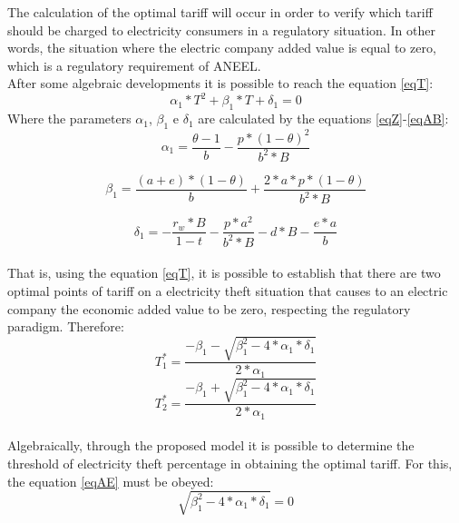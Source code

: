 \documentclass[10pt, letterpaper]{elsarticle}
\begin{document}
The calculation of the optimal tariff will occur in order to verify which tariff should be charged to electricity consumers in a regulatory situation. In other words, the situation where the electric company added value is equal to zero, which is a regulatory requirement of ANEEL.\\
After some algebraic developments it is possible to reach the equation \ref{eqT}:
\begin{equation}
\alpha_1 *T^2 +\beta_1 * T + \delta_1 = 0
\label{eqT}
\end{equation}
Where the parameters $\alpha_1$, $\beta_1$ e $\delta_1$ are calculated by the equations \ref{eqZ}-\ref{eqAB}:
\begin{equation}
\alpha_1 = \frac{\theta - 1}{b} - \frac{p*(1-\theta)^2}{b^2*B}
\label{eqZ}
\end{equation}

\begin{equation}
\beta_1 = \frac{(a+e)*(1-\theta)}{b}+\frac{2*a*p*(1-\theta)}{b^2*B}
\label{eqAA}
\end{equation}

\begin{equation}
\delta_1 = -\frac{r_w *B}{1-t}- \frac{p*a^2}{b^2*B}-d*B- \frac{e*a}{b}
\label{eqAB}
\end{equation}\\
That is, using the equation \ref{eqT}, it is possible to establish that there are two optimal points of tariff on a electricity theft situation that causes to an electric company the economic added value to be zero, respecting the regulatory paradigm.
Therefore:\\
\begin{equation}
T_1^* =  \frac{-\beta_1 -\sqrt{\beta_1^2 - 4*\alpha_1*\delta_1}}{2*\alpha_1}
\label{eqAC}
\end{equation}
\begin{equation}
T_2^* =  \frac{-\beta_1 +\sqrt{\beta_1^2 - 4*\alpha_1*\delta_1}}{2*\alpha_1}
\label{eqAD}
\end{equation}\\

Algebraically, through the proposed model it is possible to determine the threshold of electricity theft percentage in obtaining the optimal tariff. For this, the equation \ref{eqAE} must be obeyed:\\ 

\begin{equation}
\sqrt{\beta_1^2 - 4*\alpha_1*\delta_1}=0
\label{eqAE}
\end{equation}\\
\end{document}
